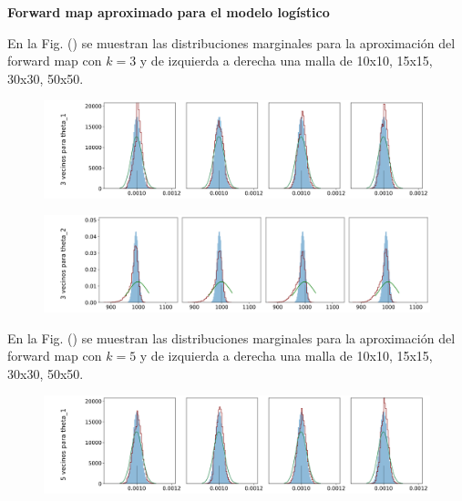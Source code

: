 \newpage

\textbf{Forward map aproximado para el modelo logístico}











En la Fig. () se muestran las distribuciones marginales para la aproximación del forward map con $k = 3$ y de izquierda a derecha una malla de 10x10, 15x15, 30x30, 50x50.

\begin{figure}[H] 
    \centering 
    \includegraphics[width = 16 cm ]{img/Exp_Central_logistico_Sigma/Figuras/Generales/Convergencia_theta1_1_logistico_sigma.png} 
\end{figure} 

\begin{figure}[H] 
    \centering 
    \includegraphics[width = 16 cm ]{img/Exp_Central_logistico_Sigma/Figuras/Generales/Convergencia_theta2_1_logistico_sigma.png} 
\end{figure} 

En la Fig. () se muestran las distribuciones marginales para la aproximación del forward map con $k = 5$ y de izquierda a derecha una malla de 10x10, 15x15, 30x30, 50x50.

\begin{figure}[H] 
    \centering 
    \includegraphics[width = 16 cm ]{img/Exp_Central_logistico_Sigma/Figuras/Generales/Convergencia_theta1_2_logistico_sigma.png} 
\end{figure} 


